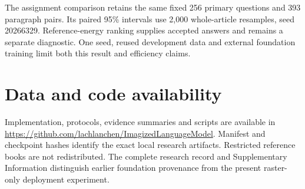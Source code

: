 The assignment comparison retains the same fixed 256 primary questions and
393 paragraph pairs. Its paired 95\% intervals use 2,000 whole-article
resamples, seed 20266329. Reference-energy ranking supplies accepted answers
and remains a separate diagnostic. One seed, reused development data and
external foundation training limit both this result and efficiency claims.

\balance
\section*{Data and code availability}
Implementation, protocols, evidence summaries and scripts are available in
\url{https://github.com/lachlanchen/ImagizedLanguageModel}. Manifest and
checkpoint hashes identify the exact local research artifacts. Restricted
reference books are not redistributed. The complete research record and
Supplementary Information distinguish earlier foundation provenance from the
present raster-only deployment experiment.


